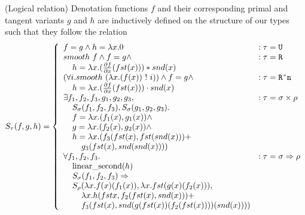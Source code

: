   \begin{definition}(Logical relation)
    Denotation functions $f$ and their corresponding primal and tangent variants $g$ and $h$ are inductively defined on the structure of our types such that they follow the relation
    \begin{equation*}
      S_\tau(f, g, h) =
        \left\{
          \begin{array}{ll}
            f = g \wedge h = \lambda x. 0 & : \tau = \texttt{U} \\
            smooth\ f \wedge f = g \wedge
              & : \tau = \texttt{R} \\
              \;\;\;\; h = \lambda x.
                (\frac{\partial f}{\partial x}(fst(x))) * snd(x) \\
            (\forall i. smooth\ (\lambda x. (f(x))\ !\ i))
              \wedge f = g \wedge
              & : \tau = \texttt{R\^{}n} \\
              \;\;\;\; h = \lambda x.
                (\frac{\partial f}{\partial x}(fst(x))) \cdot snd(x) \\
            \exists f_1, f_2, f_3, g_1, g_2, g_3,
              & : \tau = \sigma \times \rho \\
              \;\;\;\;S_\sigma(f_1, f_2, f_3), S_\sigma(g_1, g_2, g_3). \\
              \;\;\;\;f = \lambda x. (f_1(x), g_1(x)) \wedge \\
              \;\;\;\;g = \lambda x. (f_2(x), g_2(x)) \wedge \\
              \;\;\;\;h = \lambda x. (f_3(fst(x), fst (snd(x))) + \\
              \;\;\;\;\;\;\;\;g_3(fst(x), snd (snd(x)))) \\
            \forall f_1, f_2, f_3.
              & : \tau = \sigma \Rightarrow \rho \\
              \;\;\;\;\text{linear\_second}(h) \\
              \;\;\;\;S_\sigma(f_1, f_2, f_3) \Rightarrow \\
              \;\;\;\;S_\rho(\lambda x. f(x)(f_1(x)), \lambda x. fst(g(x)(f_2(x))), \\
              \;\;\;\;\;\;\;\; \lambda x. h (fst x, f_2 (fst(x), snd(x))) + \\
              \;\;\;\;\;\;\;\; f_3 (fst(x), snd(g(fst(x))(f_2(fst(x))))(snd(x))))
          \end{array}
        \right.
    \label{eqn:lr_combinator}
    \end{equation*}
  \end{definition}

